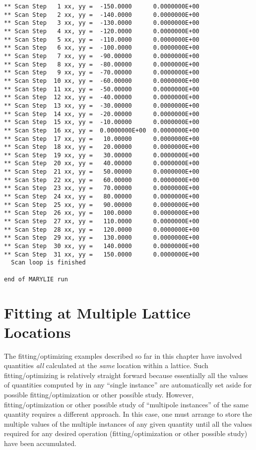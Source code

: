 \begin{footnotesize}
\begin{verbatim}
** Scan Step   1 xx, yy =  -150.0000      0.0000000E+00
** Scan Step   2 xx, yy =  -140.0000      0.0000000E+00
** Scan Step   3 xx, yy =  -130.0000      0.0000000E+00
** Scan Step   4 xx, yy =  -120.0000      0.0000000E+00
** Scan Step   5 xx, yy =  -110.0000      0.0000000E+00
** Scan Step   6 xx, yy =  -100.0000      0.0000000E+00
** Scan Step   7 xx, yy =  -90.00000      0.0000000E+00
** Scan Step   8 xx, yy =  -80.00000      0.0000000E+00
** Scan Step   9 xx, yy =  -70.00000      0.0000000E+00
** Scan Step  10 xx, yy =  -60.00000      0.0000000E+00
** Scan Step  11 xx, yy =  -50.00000      0.0000000E+00
** Scan Step  12 xx, yy =  -40.00000      0.0000000E+00
** Scan Step  13 xx, yy =  -30.00000      0.0000000E+00
** Scan Step  14 xx, yy =  -20.00000      0.0000000E+00
** Scan Step  15 xx, yy =  -10.00000      0.0000000E+00
** Scan Step  16 xx, yy =  0.0000000E+00  0.0000000E+00
** Scan Step  17 xx, yy =   10.00000      0.0000000E+00
** Scan Step  18 xx, yy =   20.00000      0.0000000E+00
** Scan Step  19 xx, yy =   30.00000      0.0000000E+00
** Scan Step  20 xx, yy =   40.00000      0.0000000E+00
** Scan Step  21 xx, yy =   50.00000      0.0000000E+00
** Scan Step  22 xx, yy =   60.00000      0.0000000E+00
** Scan Step  23 xx, yy =   70.00000      0.0000000E+00
** Scan Step  24 xx, yy =   80.00000      0.0000000E+00
** Scan Step  25 xx, yy =   90.00000      0.0000000E+00
** Scan Step  26 xx, yy =   100.0000      0.0000000E+00
** Scan Step  27 xx, yy =   110.0000      0.0000000E+00
** Scan Step  28 xx, yy =   120.0000      0.0000000E+00
** Scan Step  29 xx, yy =   130.0000      0.0000000E+00
** Scan Step  30 xx, yy =   140.0000      0.0000000E+00
** Scan Step  31 xx, yy =   150.0000      0.0000000E+00
  Scan loop is finished

end of MARYLIE run
\end{verbatim}
\end{footnotesize}

\section{Fitting at Multiple Lattice Locations}  
\label{latfunction}
The fitting/optimizing examples described so far in this chapter have
involved quantities {\em all} calculated at the {\em same} location
within a lattice.  Such fitting/optimizing is relatively straight forward
because essentially all the values of quantities computed by \Mary in any
``single instance'' are automatically set aside for possible fitting/optimization or
other possible study.  However, fitting/optimization or other possible
study of ``multipole instances'' of the same quantity requires a
different approach.  In this case, one must arrange to store the multiple
values of the multiple instances of any given quantity until all the
values required for any desired operation (fitting/optimization or other
possible study) have been accumulated.

